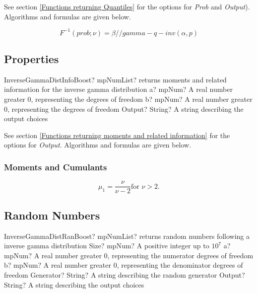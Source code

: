 See section \ref{Functions returning Quantiles} for the options for  {\itshape\sffamily Prob} and {\itshape\sffamily Output}). Algorithms and formulas are given below.

\begin{equation} 
	F^{-1}(prob;\nu)= \beta / / gamma-q-inv(\alpha, p)
\end{equation}


\subsection{Properties}
\label{InverseGammaDistributionProperties}


\begin{mpFunctionsExtract}
	\mpFunctionThree
	{InverseGammaDistInfoBoost? mpNumList? returns moments and related information for the inverse gamma distribution}
	{a? mpNum? A real number greater 0, representing the degrees of freedom}
	{b? mpNum? A real number greater 0, representing the degrees of freedom}
	{Output? String? A string describing the output choices}
\end{mpFunctionsExtract}

\vspace{0.3cm}

See section \ref{Functions returning moments and related information} for the options for {\itshape\sffamily Output}. Algorithms and formulas are given below.

\subsubsection{Moments and Cumulants}
\begin{equation} 
	\mu_1 = \frac{\nu}{\nu-2} \text{for } \nu>2.
\end{equation}




\subsection{Random Numbers}

\begin{mpFunctionsExtract}
	\mpFunctionFive
	{InverseGammaDistRanBoost? mpNumList? returns random numbers following a inverse gamma distribution}
	{Size? mpNum? A positive integer up to $10^7$}
	{a? mpNum? A real number greater 0, representing the numerator  degrees of freedom}
	{b? mpNum? A real number greater 0, representing the denominator degrees of freedom}
	{Generator? String? A string describing the random generator}
	{Output? String? A string describing the output choices}
\end{mpFunctionsExtract}

